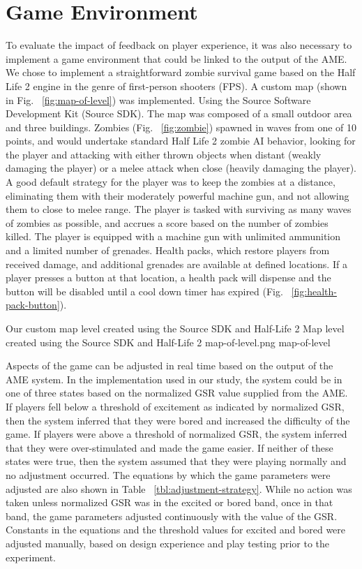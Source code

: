
\section{Game Environment}
To evaluate the impact of feedback on player experience, it was also necessary to implement a game environment that could be linked to the output of the AME. We chose to implement a straightforward zombie survival game based on the Half Life 2 engine in the genre of first-person shooters (FPS). A custom map (shown in Fig. ~\ref{fig:map-of-level}) was implemented. Using the Source Software Development Kit (Source SDK). The map was composed of a small outdoor area and three buildings. Zombies (Fig. ~\ref{fig:zombie}) spawned in waves from one of 10 points, and would undertake standard Half Life 2 zombie AI behavior, looking for the player and attacking with either thrown objects when distant (weakly damaging the player) or a melee attack when close (heavily damaging the player). A good default strategy for the player was to keep the zombies at a distance, eliminating them with their moderately powerful machine gun, and not allowing them to close to melee range. The player is tasked with surviving as many waves of zombies as possible, and accrues a score based on the number of zombies killed. The player is equipped with a machine gun with unlimited ammunition and a limited number of grenades. Health packs, which restore players from received damage, and additional grenades are available at defined locations. If a player presses a button at that location, a health pack will dispense and the button will be disabled until a cool down timer has expired (Fig. ~\ref{fig:health-pack-button}).

\largeimg
{Our custom map level created using the Source SDK and Half-Life 2}
{Map level created using the Source SDK and Half-Life 2}
{map-of-level.png}
{map-of-level}

Aspects of the game can be adjusted in real time based on the output of the AME system. In the implementation used in our study, the system could be in one of three states based on the normalized GSR value supplied from the AME. If players fell below a threshold of excitement as indicated by normalized GSR, then the system inferred that they were bored and increased the difficulty of the game. If players were above a threshold of normalized GSR, the system inferred that they were over-stimulated and made the game easier. If neither of these states were true, then the system assumed that they were playing normally and no adjustment occurred. The equations by which the game parameters were adjusted are also shown in Table ~\ref{tbl:adjustment-strategy}. While no action was taken unless normalized GSR was in the excited or bored band, once in that band, the game parameters adjusted continuously with the value of the GSR. Constants in the equations and the threshold values for excited and bored were adjusted manually, based on design experience and play testing prior to the experiment.

